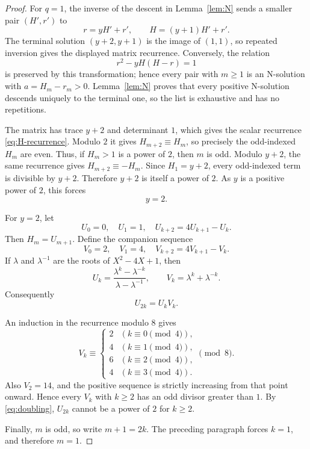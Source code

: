\documentclass[11pt]{amsart}
\theoremstyle{remark}
\begin{document}
\begin{proof}
For $q=1$, the inverse of the descent in Lemma~\ref{lem:N} sends a
smaller pair $(H',r')$ to
\[
 r=yH'+r',
 \qquad
 H=(y+1)H'+r'.
\]
The terminal solution $(y+2,y+1)$ is the image of $(1,1)$, so repeated
inversion gives the displayed matrix recurrence.  Conversely, the
relation
\[
 r^2-yH(H-r)=1
\]
is preserved by this transformation; hence every pair with $m\ge1$
is an N-solution with $a=H_m-r_m>0$.  Lemma~\ref{lem:N} proves that
every positive N-solution descends uniquely to the terminal one, so the
list is exhaustive and has no repetitions.

The matrix has trace $y+2$ and determinant $1$, which gives the scalar
recurrence \eqref{eq:H-recurrence}.  Modulo $2$ it gives
$H_{m+2}\equiv H_m$, so precisely the odd-indexed $H_m$ are even.
Thus, if $H_m>1$ is a power of $2$, then $m$ is odd.  Modulo $y+2$,
the same recurrence gives $H_{m+2}\equiv-H_m$.  Since
$H_1=y+2$, every odd-indexed term is divisible by $y+2$.  Therefore
$y+2$ is itself a power of $2$.  As $y$ is a positive power of $2$,
this forces
\begin{equation}\label{eq:y-two}
 y=2.
\end{equation}

For $y=2$, let
\[
 U_0=0,
 \quad U_1=1,
 \quad U_{k+2}=4U_{k+1}-U_k.
\]
Then $H_m=U_{m+1}$.  Define the companion sequence
\[
 V_0=2,
 \quad V_1=4,
 \quad V_{k+2}=4V_{k+1}-V_k.
\]
If $\lambda$ and $\lambda^{-1}$ are the roots of
$X^2-4X+1$, then
\[
 U_k=\frac{\lambda^k-\lambda^{-k}}{\lambda-\lambda^{-1}},
 \qquad
 V_k=\lambda^k+\lambda^{-k}.
\]
Consequently
\begin{equation}\label{eq:doubling}
 U_{2k}=U_kV_k.
\end{equation}

An induction in the recurrence modulo $8$ gives
\[
 V_k\equiv
 \begin{cases}
 2 & (k\equiv0\pmod4),\\
 4 & (k\equiv1\pmod4),\\
 6 & (k\equiv2\pmod4),\\
 4 & (k\equiv3\pmod4).
 \end{cases}
 \pmod8.
\]
Also $V_2=14$, and the positive sequence is strictly increasing from
that point onward.  Hence every $V_k$ with $k\ge2$ has an odd divisor
greater than $1$.  By \eqref{eq:doubling}, $U_{2k}$ cannot be a power
of $2$ for $k\ge2$.

Finally, $m$ is odd, so write $m+1=2k$.  The preceding paragraph
forces $k=1$, and therefore $m=1$.
\end{proof}
\end{document}
